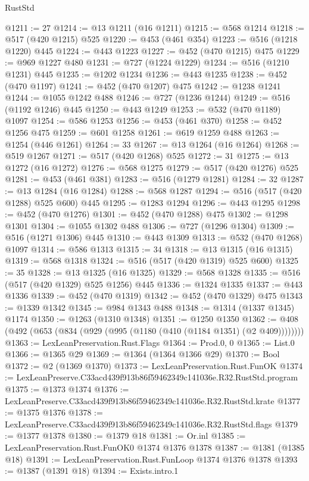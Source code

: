\begin{lexlean}{RustStd}
\begin{coremodule}
@1211 := 27
@1214 := @13 @1211 (@16 @1211)
@1215 := @568 @1214
@1218 := @517 (@420 @1215) @525
@1220 := @453 (@461 @354)
@1223 := @516 (@1218 @1220) @445
@1224 := @443 @1223
@1227 := @452 (@470 @1215) @475
@1229 := @969 @1227 @480
@1231 := @727 (@1224 @1229)
@1234 := @516 (@1210 @1231) @445
@1235 := @1202 @1234
@1236 := @443 @1235
@1238 := @452 (@470 @1197)
@1241 := @452 (@470 @1207) @475
@1242 := @1238 @1241
@1244 := @1055 @1242 @488
@1246 := @727 (@1236 @1244)
@1249 := @516 (@1192 @1246) @445
@1250 := @443 @1249
@1253 := @532 (@470 @1189) @1097
@1254 := @586 @1253
@1256 := @453 (@461 @370)
@1258 := @452 @1256 @475
@1259 := @601 @1258
@1261 := @619 @1259 @488
@1263 := @1254 (@446 @1261)
@1264 := 33
@1267 := @13 @1264 (@16 @1264)
@1268 := @519 @1267
@1271 := @517 (@420 @1268) @525
@1272 := 31
@1275 := @13 @1272 (@16 @1272)
@1276 := @568 @1275
@1279 := @517 (@420 @1276) @525
@1281 := @453 (@461 @381)
@1283 := @516 (@1279 @1281)
@1284 := 32
@1287 := @13 @1284 (@16 @1284)
@1288 := @568 @1287
@1294 := @516 (@517 (@420 @1288) @525 @600) @445
@1295 := @1283 @1294
@1296 := @443 @1295
@1298 := @452 (@470 @1276)
@1301 := @452 (@470 @1288) @475
@1302 := @1298 @1301
@1304 := @1055 @1302 @488
@1306 := @727 (@1296 @1304)
@1309 := @516 (@1271 @1306) @445
@1310 := @443 @1309
@1313 := @532 (@470 @1268) @1097
@1314 := @586 @1313
@1315 := 34
@1318 := @13 @1315 (@16 @1315)
@1319 := @568 @1318
@1324 := @516 (@517 (@420 @1319) @525 @600)
@1325 := 35
@1328 := @13 @1325 (@16 @1325)
@1329 := @568 @1328
@1335 := @516 (@517 (@420 @1329) @525 @1256) @445
@1336 := @1324 @1335
@1337 := @443 @1336
@1339 := @452 (@470 @1319)
@1342 := @452 (@470 @1329) @475
@1343 := @1339 @1342
@1345 := @984 @1343 @488
@1348 := @1314 (@1337 @1345) @1174
@1350 := @1263 (@1310 @1348)
@1351 := @1250 @1350
@1362 := @408 (@492 (@653 (@834 (@929 (@995 (@1180 (@410 (@1184 @1351) (@2 @409))))))))
@1363 := LexLeanPreservation.Rust.Flags
@1364 := Prod.{0, 0}
@1365 := List.{0}
@1366 := @1365 @29
@1369 := @1364 (@1364 @1366 @29)
@1370 := Bool
@1372 := @2 (@1369 @1370)
@1373 := LexLeanPreservation.Rust.FunOK
@1374 := LexLeanPreserve.C33acd439f913b86f59462349c141036e.R32.RustStd.program
@1375 := @1373 @1374
@1376 := LexLeanPreserve.C33acd439f913b86f59462349c141036e.R32.RustStd.krate
@1377 := @1375 @1376
@1378 := LexLeanPreserve.C33acd439f913b86f59462349c141036e.R32.RustStd.flags
@1379 := @1377 @1378
@1380 := @1379 @18
@1381 := Or.inl
@1385 := LexLeanPreservation.Rust.FunOK0 @1374 @1376 @1378
@1387 := @1381 (@1385 @18)
@1391 := LexLeanPreservation.Rust.FunLoop @1374 @1376 @1378
@1393 := @1387 (@1391 @18)
@1394 := Exists.intro.{1}

\end{coremodule}
\end{lexlean}
